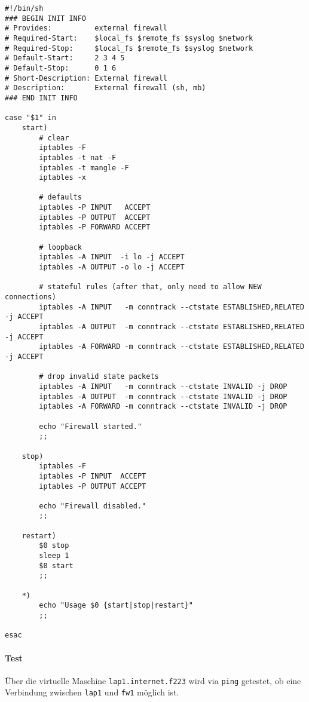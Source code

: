 \begin{lstlisting}[label=lst:init,caption={Basis Firewall Bootskript.}]
#!/bin/sh
### BEGIN INIT INFO
# Provides:          external firewall
# Required-Start:    $local_fs $remote_fs $syslog $network
# Required-Stop:     $local_fs $remote_fs $syslog $network
# Default-Start:     2 3 4 5
# Default-Stop:      0 1 6
# Short-Description: External firewall
# Description:       External firewall (sh, mb)
### END INIT INFO

case "$1" in
    start)
        # clear
        iptables -F
        iptables -t nat -F
        iptables -t mangle -F
        iptables -x

        # defaults
        iptables -P INPUT   ACCEPT
        iptables -P OUTPUT  ACCEPT
        iptables -P FORWARD ACCEPT

        # loopback
        iptables -A INPUT  -i lo -j ACCEPT
        iptables -A OUTPUT -o lo -j ACCEPT

        # stateful rules (after that, only need to allow NEW connections)
        iptables -A INPUT   -m conntrack --ctstate ESTABLISHED,RELATED -j ACCEPT
        iptables -A OUTPUT  -m conntrack --ctstate ESTABLISHED,RELATED -j ACCEPT
        iptables -A FORWARD -m conntrack --ctstate ESTABLISHED,RELATED -j ACCEPT

        # drop invalid state packets
        iptables -A INPUT   -m conntrack --ctstate INVALID -j DROP
        iptables -A OUTPUT  -m conntrack --ctstate INVALID -j DROP
        iptables -A FORWARD -m conntrack --ctstate INVALID -j DROP

        echo "Firewall started."
        ;;

    stop)
        iptables -F
        iptables -P INPUT  ACCEPT
        iptables -P OUTPUT ACCEPT

        echo "Firewall disabled."
        ;;

    restart)
        $0 stop
        sleep 1
        $0 start
        ;;

    *)
        echo "Usage $0 {start|stop|restart}"
        ;;

esac
\end{lstlisting}
%

\paragraph{Test} Über die virtuelle Maschine {\tt lap1.internet.f223} wird
via {\tt ping} getestet, ob eine Verbindung zwischen {\tt lap1} und {\tt fw1}
möglich ist.


